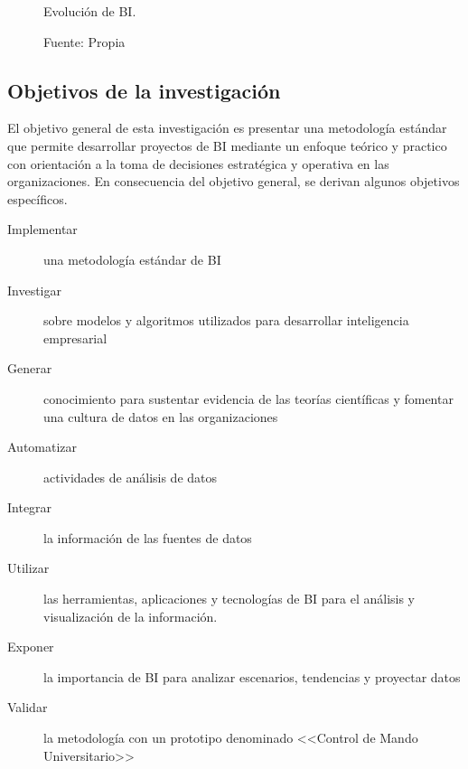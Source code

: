 \documentclass[12pt,jou]{apa7}
\begin{document}
\begin{figure}[h]
\caption{Evolución de BI.}
\centering
{}
\caption*{ Fuente: Propia}
\label{fig:evolucionBI}
\end{figure}


\subsection{Objetivos de la investigación}
El objetivo general de esta investigación es presentar una metodología estándar que permite desarrollar proyectos de BI mediante un enfoque teórico y practico con orientación a la toma de decisiones estratégica y operativa en las organizaciones. En consecuencia del objetivo general, se derivan algunos objetivos específicos.
\begin{description}
		
\item[Implementar] una metodología estándar de BI
		
\item[Investigar] sobre modelos y algoritmos utilizados para desarrollar inteligencia empresarial
		
\item[Generar] conocimiento para sustentar evidencia de las teorías científicas y fomentar una cultura de datos en las organizaciones
		
\item[Automatizar] actividades de análisis de datos
		
\item[Integrar] la información de las fuentes de datos
		
\item[Utilizar] las herramientas, aplicaciones y tecnologías de BI para el análisis y visualización de la información.
		
\item[Exponer] la importancia de BI para analizar escenarios, tendencias y proyectar datos
		
\item[Validar] la metodología con un prototipo denominado <<Control de Mando Universitario>>
\end{description}
\end{document}
